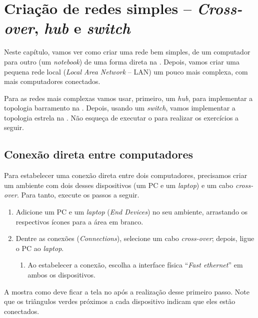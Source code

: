 \chapter{Criação de redes simples -- \textit{Cross-over}, \textit{hub} e \textit{switch}}\label{chp:redesSimples}

Neste capítulo, vamos ver como criar uma rede bem simples, de um computador para outro (um \textit{notebook}) de uma forma direta na . Depois, vamos criar uma pequena rede local (\textit{Local Area Network} -- LAN) um pouco mais complexa, com mais computadores conectados. 

Para as redes mais complexas vamos usar, primeiro, um \textit{hub}, para implementar a topologia barramento na . Depois, usando um \textit{switch}, vamos implementar a topologia estrela na . 
Não esqueça de executar o \CPT para realizar os exercícios a seguir.

\section{Conexão direta entre computadores}\label{sec:conexDireta}

Para estabelecer uma conexão direta entre dois computadores, precisamos criar um ambiente com dois desses dispositivos (um PC e um \textit{laptop}) e um cabo \textit{cross-over}. Para tanto, execute os passos a seguir.

\begin{enumerate}[label*=\arabic*.]
    \item Adicione um PC e um \textit{laptop} (\textit{End Devices}) no seu ambiente, arrastando os respectivos ícones para a área em branco.
    \item Dentre as conexões (\textit{Connections}), selecione um cabo \textit{cross-over}; depois, ligue o PC ao \textit{laptop}. 
    \begin{enumerate}[label*=\arabic*.]
       \item Ao estabelecer a conexão, escolha a interface física \enquote{\textit{Fast ethernet}} em ambos os dispositivos.
    \end{enumerate}
\end{enumerate}

A  mostra como deve ficar a tela no \CPT após a realização desse primeiro passo. Note que os triângulos verdes próximos a cada dispositivo indicam que eles estão conectados.

